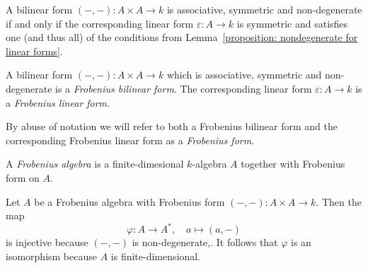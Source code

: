 \begin{corollary}
  A bilinear form $(-,-) \colon A \times A \to k$ is associative, symmetric and non-degenerate if and only if the corresponding linear form $\varepsilon \colon A \to k$ is symmetric and satisfies one (and thus all) of the conditions from Lemma~\ref{proposition: nondegenerate for linear forms}.
\end{corollary}


\begin{definition}
  A bilinear form $(-,-) \colon A \times A \to k$ which is associative, symmetric and non-degenerate is a \emph{Frobenius bilinear form}.
  The corresponding linear form $\varepsilon \colon A \to k$ is a \emph{Frobenius linear form}.
\end{definition}


\begin{notation}
  By abuse of notation we will refer to both a Frobenius bilinear form and the corresponding Frobenius linear form as a \emph{Frobenius form}.
\end{notation}


\begin{definition}
  A \emph{Frobenius algebra} is a finite-dimesional $k$-algebra $A$ together with Frobenius form on $A$.
\end{definition}


\begin{remark}
  Let $A$ be a Frobenius algebra with Frobenius form $(-,-) \colon A \times A \to k$.
  Then the map
  \[
            \varphi
    \colon  A
    \to     A^*,
    \quad   a
    \mapsto (a,-)
  \]
  is injective because $(-,-)$ is non-degenerate,.
  It follows that $\varphi$ is an isomorphism because $A$ is finite-dimensional.
\end{remark}


